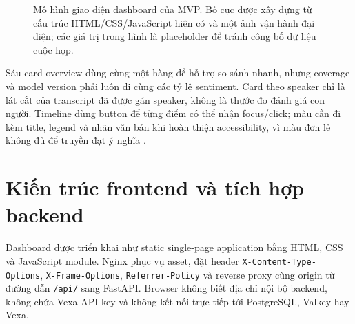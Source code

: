 \begin{figure}[H]
{%
}
\caption{Mô hình giao diện dashboard của MVP. Bố cục được xây dựng từ cấu trúc HTML/CSS/JavaScript hiện có và một ảnh vận hành đại diện; các giá trị trong hình là placeholder để tránh công bố dữ liệu cuộc họp.}
\label{fig:frontend-ui}
\end{figure}

Sáu card overview dùng cùng một hàng để hỗ trợ so sánh nhanh, nhưng coverage và model version phải luôn đi cùng các tỷ lệ sentiment. Card theo speaker chỉ là lát cắt của transcript đã được gán speaker, không là thước đo đánh giá con người. Timeline dùng button để từng điểm có thể nhận focus/click; màu cần đi kèm title, legend và nhãn văn bản khi hoàn thiện accessibility, vì màu đơn lẻ không đủ để truyền đạt ý nghĩa \cite{wcag2024}.

\section{Kiến trúc frontend và tích hợp backend}
Dashboard được triển khai như static single-page application bằng HTML, CSS và JavaScript module. Nginx phục vụ asset, đặt header \texttt{X-Content-Type-Options}, \texttt{X-Frame-Options}, \texttt{Referrer-Policy} và reverse proxy cùng origin từ đường dẫn \texttt{/api/} sang FastAPI. Browser không biết địa chỉ nội bộ backend, không chứa Vexa API key và không kết nối trực tiếp tới PostgreSQL, Valkey hay Vexa.

